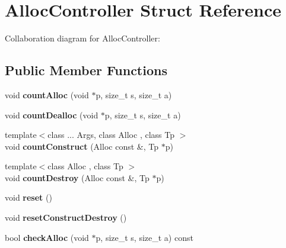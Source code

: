 \hypertarget{struct_alloc_controller}{}\section{Alloc\+Controller Struct Reference}
\label{struct_alloc_controller}


Collaboration diagram for Alloc\+Controller\+:
\subsection*{Public Member Functions}
\begin{DoxyCompactItemize}
\item 
\mbox{\label{struct_alloc_controller_a6de992d5595832bf3f35bcc7a680afeb}} 
void {\bfseries count\+Alloc} (void $\ast$p, size\+\_\+t s, size\+\_\+t a)
\item 
\mbox{\label{struct_alloc_controller_a3b602f5ce7cf8907180eb8ea44471af3}} 
void {\bfseries count\+Dealloc} (void $\ast$p, size\+\_\+t s, size\+\_\+t a)
\item 
\mbox{\label{struct_alloc_controller_a005df1f4464a5ab8d6ef5e9c56da509b}} 
{\footnotesize template$<$class ... Args, class Alloc , class Tp $>$ }\\void {\bfseries count\+Construct} (Alloc const \&, Tp $\ast$p)
\item 
\mbox{\label{struct_alloc_controller_a7a828306b8845ae0a0780a4cb56aaec7}} 
{\footnotesize template$<$class Alloc , class Tp $>$ }\\void {\bfseries count\+Destroy} (Alloc const \&, Tp $\ast$p)
\item 
\mbox{\label{struct_alloc_controller_a89614f848caa680c4f3df3dfde5c648a}} 
void {\bfseries reset} ()
\item 
\mbox{\label{struct_alloc_controller_a041ddd7c5d244743f9e55d2e0fa0a727}} 
void {\bfseries reset\+Construct\+Destroy} ()
\item 
\mbox{\label{struct_alloc_controller_a3f1565a60d1d77a4a21b0d0f2c1ccac8}} 
bool {\bfseries check\+Alloc} (void $\ast$p, size\+\_\+t s, size\+\_\+t a) const

\end{DoxyCompactItemize}
